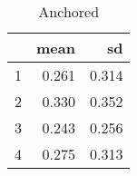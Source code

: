 \begin{table}[ht]
\centering
\begin{tabular}{rrr}
  \hline
 & mean & sd \\ 
  \hline
1 & 0.261 & 0.314 \\ 
  2 & 0.330 & 0.352 \\ 
  3 & 0.243 & 0.256 \\ 
  4 & 0.275 & 0.313 \\ 
   \hline
\end{tabular}
\caption{Anchored} 
\label{table:anchored-theta}
\end{table}

